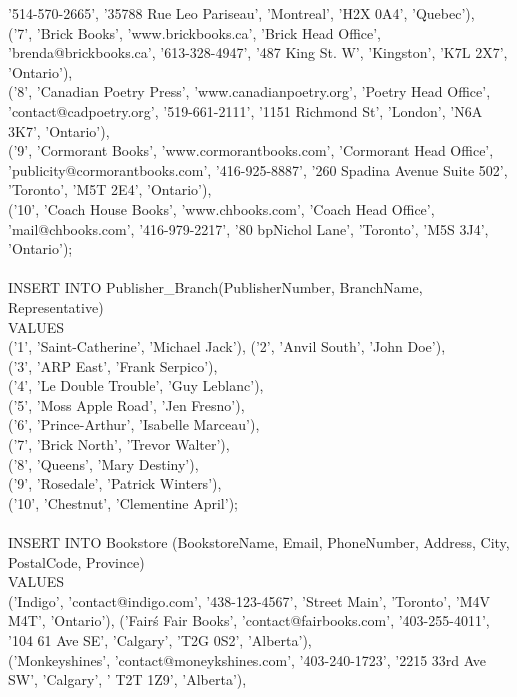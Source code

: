 \documentclass{scrreprt}
\begin{document}
        '514-570-2665', '35788 Rue Leo Pariseau', 'Montreal', 'H2X 0A4', 'Quebec'),\\
       ('7', 'Brick Books', 'www.brickbooks.ca', 'Brick Head Office', 'brenda@brickbooks.ca', '613-328-4947',
        '487 King St. W', 'Kingston', 'K7L 2X7', 'Ontario'),\\
       ('8', 'Canadian Poetry Press', 'www.canadianpoetry.org', 'Poetry Head Office', 'contact@cadpoetry.org',
        '519-661-2111', '1151 Richmond St', 'London', 'N6A 3K7', 'Ontario'),\\
       ('9', 'Cormorant Books', 'www.cormorantbooks.com', 'Cormorant Head Office', 'publicity@cormorantbooks.com',
       '416-925-8887', '260 Spadina Avenue Suite 502', 'Toronto', 'M5T 2E4', 'Ontario'),\\
       ('10', 'Coach House Books', 'www.chbooks.com', 'Coach Head Office', 'mail@chbooks.com', '416-979-2217',
        '80 bpNichol Lane', 'Toronto', 'M5S 3J4', 'Ontario');\\\\
INSERT INTO Publisher_Branch(PublisherNumber, BranchName, Representative)\\
VALUES\\ ('1', 'Saint-Catherine', 'Michael Jack'),
       ('2', 'Anvil South', 'John Doe'),\\
       ('3', 'ARP East', 'Frank Serpico'),\\
       ('4', 'Le Double Trouble', 'Guy Leblanc'),\\
       ('5', 'Moss Apple Road', 'Jen Fresno'),\\
       ('6', 'Prince-Arthur', 'Isabelle Marceau'),\\
       ('7', 'Brick North', 'Trevor Walter'),\\
       ('8', 'Queens', 'Mary Destiny'),\\
       ('9', 'Rosedale', 'Patrick Winters'),\\
       ('10', 'Chestnut', 'Clementine April');\\\\
INSERT INTO Bookstore (BookstoreName, Email, PhoneNumber, Address, City, PostalCode, Province)\\
VALUES\\ ('Indigo', 'contact@indigo.com', '438-123-4567', 'Street Main', 'Toronto', 'M4V M4T', 'Ontario'),
       ('Fair\'s Fair Books', 'contact@fairbooks.com', '403-255-4011', '104 61 Ave SE', 'Calgary', 'T2G 0S2', 'Alberta'),\\
       ('Monkeyshines', 'contact@moneykshines.com', '403-240-1723', '2215 33rd Ave SW', 'Calgary', ' T2T 1Z9', 'Alberta'),\\
\end{document}

